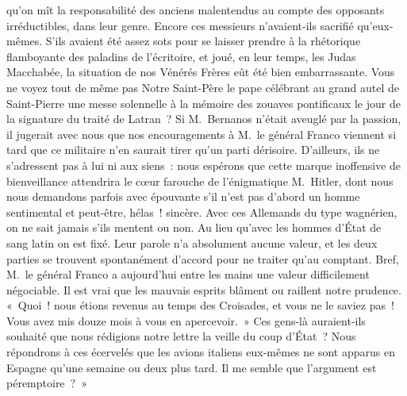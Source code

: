 \documentclass[french,twoside]{book} %
\newcommand{\astertri}{\medskip\par\centerline{\color{rubric}\large\selectfont{\syms ✻\,✻\,✻}}\medskip\par}%
\begin{document}
qu’on mît la responsabilité des anciens malentendus au compte des opposants irréductibles, dans leur genre. Encore ces messieurs n’avaient-ils sacrifié qu’eux-mêmes. S’ils avaient été assez sots pour se laisser prendre à la rhétorique flamboyante des paladins de l’écritoire, et joué, en leur temps, les Judas Macchabée, la situation de nos Vénérés Frères eût été bien embarrassante. Vous ne voyez tout de même pas Notre Saint-Père le pape célébrant au grand autel de Saint-Pierre une messe solennelle à la mémoire des zouaves pontificaux le jour de la signature du traité de Latran ? Si M. Bernanos n’était aveuglé par la passion, il jugerait avec nous que nos encouragements à M. le général Franco viennent si tard que ce militaire n’en saurait tirer qu’un parti dérisoire. D’ailleurs, ils ne s’adressent pas à lui ni aux siens : nous espérons que cette marque inoffensive de bienveillance attendrira le cœur farouche de l’énigmatique M. Hitler, dont nous nous demandons parfois avec épouvante s’il n’est pas d’abord un homme sentimental et peut-être, hélas ! sincère. Avec ces Allemands du type wagnérien, on ne sait jamais s’ils mentent ou non. Au lieu qu’avec les hommes d’État de sang latin on est fixé. Leur parole n’a absolument aucune valeur, et les deux parties se trouvent spontanément d’accord pour ne traiter qu’au comptant. Bref, M. le général Franco a aujourd’hui entre les mains une valeur difficilement négociable. Il est vrai que les mauvais esprits blâment ou raillent notre prudence. « Quoi ! nous étions revenus au temps des Croisades, et vous ne le saviez pas ! Vous avez mis douze mois à vous en apercevoir. » Ces gens-là auraient-ils souhaité que nous rédigions notre lettre la veille du coup d’État ? Nous répondrons à ces écervelés que les avions italiens eux-mêmes ne sont apparus en Espagne qu’une semaine ou deux plus tard. Il me semble que l’argument est péremptoire ? »\par
 \par

\astertri
\end{document}
